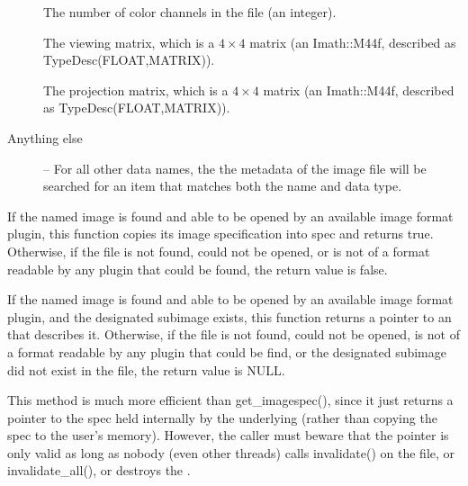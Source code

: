 \begin{description}
\item[\rm {}] The number of color channels in the file 
(an integer).

\item[\rm {}] The viewing matrix, which is a
$4 \times 4$ matrix (an {\cf Imath::M44f}, described as {\cf
  TypeDesc(FLOAT,MATRIX)}).

\item[\rm {}] The projection matrix, which is a
$4 \times 4$ matrix (an {\cf Imath::M44f}, described as {\cf
  TypeDesc(FLOAT,MATRIX)}).

\item[Anything else] -- For all other data names, the
the metadata of the image file will be searched for an item that
matches both the name and data type.

\end{description}
\apiend


If the named image is found and able to be opened by an available
image format plugin, this function copies its image specification into
{\cf spec} and returns {\cf true}.  Otherwise, if the file is not
found, could not be opened, or is not of a format readable by any
plugin that could be found, the return value is {\cf false}.
\apiend



If the named image is found and able to be opened by an available
image format plugin, and the designated subimage exists, this function
returns a pointer to an \ImageSpec that describes it.  Otherwise, if the
file is not found, could not be opened, is not of a format readable by
any plugin that could be find, or the designated subimage did
not exist in the file, the return value is NULL.

This method is much more efficient than {\cf get_imagespec()}, since it
just returns a pointer to the spec held internally by the underlying \ImageCache
(rather than copying the spec to the user's memory).  However, the
caller must beware that the pointer is only valid as long as nobody
(even other threads) calls {\cf invalidate()} on the file, or {\cf
  invalidate_all()}, or destroys the \TextureSystem.
\apiend


